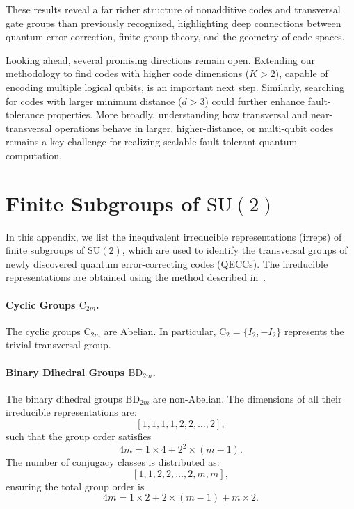 \documentclass[8pt]{article}
\theoremstyle{definition}
\begin{document}
These results reveal a far richer structure of nonadditive codes and transversal gate groups than previously recognized, highlighting deep connections between quantum error correction, finite group theory, and the geometry of code spaces.

Looking ahead, several promising directions remain open. Extending our methodology to find codes with higher code dimensions ($K>2$), capable of encoding multiple logical qubits, is an important next step. Similarly, searching for codes with larger minimum distance ($d>3$) could further enhance fault-tolerance properties. More broadly, understanding how transversal and near-transversal operations behave in larger, higher-distance, or multi-qubit codes remains a key challenge for realizing scalable fault-tolerant quantum computation.

\appendix

\section{Finite Subgroups of \texorpdfstring{$\mathrm{SU}(2)$}{SU(2)}}\label{appendix:irrep-su2-subgroup}

In this appendix, we list the inequivalent irreducible representations (irreps) of finite subgroups of \(\mathrm{SU}(2)\), which are used to identify the transversal groups of newly discovered quantum error-correcting codes (QECCs). The irreducible representations are obtained using the method described in~\cite{dixon1970computing}.

\paragraph{Cyclic Groups \texorpdfstring{$\mathrm{C}_{2m}$}{C₂ₘ}.}The cyclic groups \(\mathrm{C}_{2m}\) are Abelian. In particular, \(\mathrm{C}_2 = \{I_2, -I_2\}\) represents the trivial transversal group.

\paragraph{Binary Dihedral Groups \texorpdfstring{$\mathrm{BD}_{2m}$}{BD₂ₘ}.}The binary dihedral groups \(\mathrm{BD}_{2m}\) are non-Abelian. The dimensions of all their irreducible representations are:
\[[1,1,1,1,2,2,\ldots,2],\]
such that the group order satisfies
\[4m = 1 \times 4 + 2^2 \times (m-1).\]
The number of conjugacy classes is distributed as:
\[[1,1,2,2,\ldots,2,m,m],\]
ensuring the total group order is
\[4m = 1 \times 2 + 2 \times (m-1) + m \times 2.\]
\end{document}
